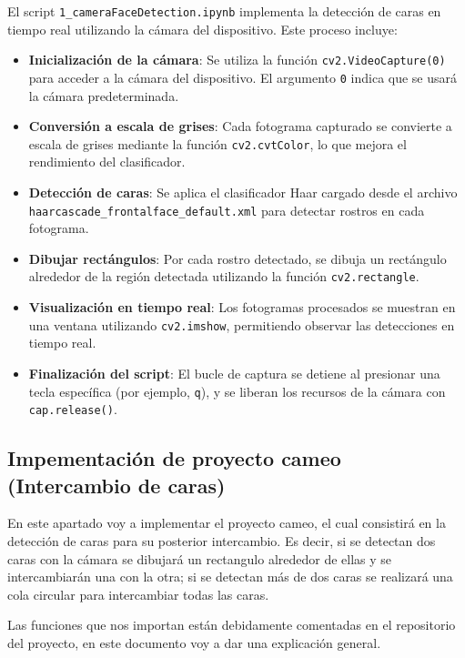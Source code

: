 \documentclass[a4paper]{article}
\begin{document}
El script \texttt{1\_cameraFaceDetection.ipynb} implementa la detección de caras en tiempo real utilizando la cámara del dispositivo. Este proceso incluye:

\begin{itemize}
    \item \textbf{Inicialización de la cámara}: Se utiliza la función \texttt{cv2.VideoCapture(0)} para acceder a la cámara del dispositivo. El argumento \texttt{0} indica que se usará la cámara predeterminada.
    \item \textbf{Conversión a escala de grises}: Cada fotograma capturado se convierte a escala de grises mediante la función \texttt{cv2.cvtColor}, lo que mejora el rendimiento del clasificador.
    \item \textbf{Detección de caras}: Se aplica el clasificador Haar cargado desde el archivo \texttt{haarcascade\_frontalface\_default.xml} para detectar rostros en cada fotograma.
    \item \textbf{Dibujar rectángulos}: Por cada rostro detectado, se dibuja un rectángulo alrededor de la región detectada utilizando la función \texttt{cv2.rectangle}.
    \item \textbf{Visualización en tiempo real}: Los fotogramas procesados se muestran en una ventana utilizando \texttt{cv2.imshow}, permitiendo observar las detecciones en tiempo real.
    \item \textbf{Finalización del script}: El bucle de captura se detiene al presionar una tecla específica (por ejemplo, \texttt{q}), y se liberan los recursos de la cámara con \texttt{cap.release()}.
\end{itemize}


\subsection{Impementación de proyecto cameo (Intercambio de caras)}

En este apartado voy a implementar el proyecto cameo, el cual consistirá en la detección de caras para su posterior intercambio.
Es decir, si se detectan dos caras con la cámara se dibujará un rectangulo alrededor de ellas y se intercambiarán una con la otra; si se detectan más de dos caras se realizará una cola circular para intercambiar todas las caras.

Las funciones que nos importan están debidamente comentadas en el repositorio del proyecto, en este documento voy a dar una explicación general.\\
\end{document}
